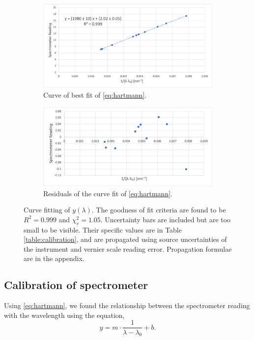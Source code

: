 \documentclass[12pt]{article}
\begin{document}
\begin{figure}[h!]
    \centering
    \begin{subfigure}{0.7\textwidth}
        \includegraphics[width=\textwidth]{figure/fit.png}
        \caption{Curve of best fit of \eqref{eq:hartmann}.}
        \label{fig:fit}
    \end{subfigure}
    \hfill
    \begin{subfigure}{0.5\textwidth}
        \includegraphics[width=\textwidth]{figure/residuals.png}
        \caption{Residuals of the curve fit of \eqref{eq:hartmann}.}
        \label{fig:residuals}
    \end{subfigure}
    \label{fig:data}
    \caption{Curve fitting of $y(\lambda)$. The goodness of fit criteria are found to be $R^2=0.999$ and $\chi_v^2=1.05$. Uncertainty bars are included but are too small to be visible. Their specific values are in Table \ref{table:calibration}, and are propagated using source uncertainties of the instrument and vernier scale reading error. Propagation formulae are in the appendix.}
\end{figure}
\subsection{Calibration of spectrometer}
Using \eqref{eq:hartmann}, we found the relationship between the spectrometer reading with the wavelength using the equation, 
\begin{equation}
y=m \cdot \frac{1}{\lambda - \lambda_0}+b. 
\label{eq:fit}
\end{equation}
\end{document}
